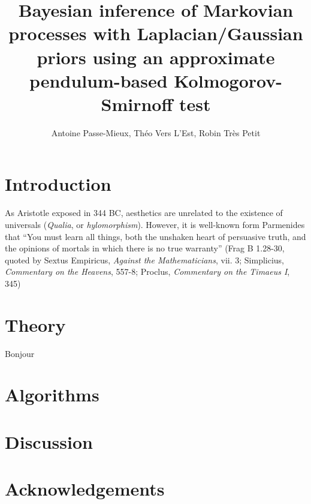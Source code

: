 \documentclass[a4paper]{article}
\author{Antoine Passe-Mieux, Théo Vers L'Est, Robin Très Petit}
\title{Bayesian inference of Markovian processes with Laplacian/Gaussian priors
using an approximate pendulum-based Kolmogorov-Smirnoff test}
\begin{document}
\maketitle

\section{Introduction}
As Aristotle exposed in 344 BC, aesthetics are unrelated to the existence of
universals (\emph{Qualia}, or \emph{hylomorphism}).
However, it is well-known form Parmenides that “You must learn all things, both the unshaken heart of persuasive truth, and the opinions of mortals in which there is no true warranty” (Frag B 1.28-30, quoted by Sextus Empiricus, \emph{Against the Mathematicians}, vii. 3; Simplicius, \emph{Commentary on the Heavens}, 557-8; Proclus, \emph{Commentary on the Timaeus I}, 345)

\section{Theory}
Bonjour

\section{Algorithms}

\section{Discussion}

\section{Acknowledgements}
\end{document}
